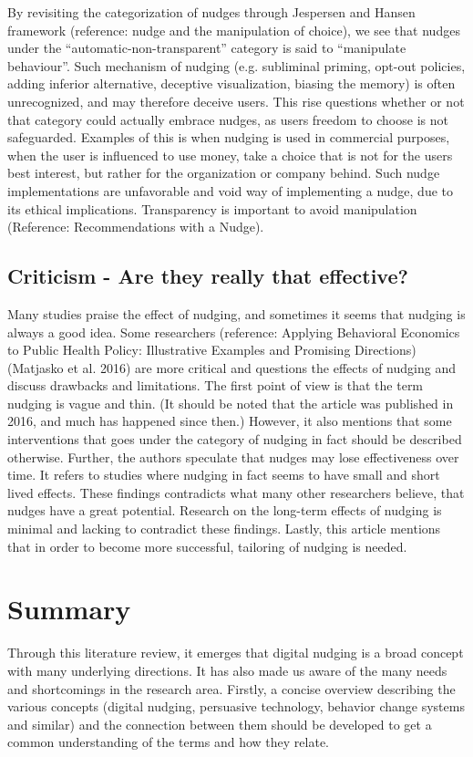 By revisiting the categorization of nudges through Jespersen and Hansen framework (reference: nudge and the manipulation of choice), we see that nudges under the “automatic-non-transparent” category is said to “manipulate behaviour”. Such mechanism of nudging (e.g. subliminal priming, opt-out policies, adding inferior alternative, deceptive visualization, biasing the memory) is often unrecognized, and may therefore deceive users. This rise questions whether or not that category could actually embrace nudges, as users freedom to choose is not safeguarded. Examples of this is when nudging is used in commercial purposes, when the user is influenced to use money, take a choice that is not for the users best interest, but rather for the organization or company behind. Such nudge implementations are unfavorable and void way of implementing a nudge, due to its ethical implications. Transparency is important to avoid manipulation (Reference: Recommendations with a Nudge). 

\subsection{Criticism - Are they really that effective?}
Many studies praise the effect of nudging, and sometimes it seems that nudging is always a good idea. Some researchers (reference: Applying Behavioral Economics to Public Health Policy: Illustrative Examples and Promising Directions) (Matjasko et al. 2016) are more critical and questions the effects of nudging and discuss drawbacks and limitations. The first point of view is that the term nudging is vague and thin. (It should be noted that the article was published in 2016, and much has happened since then.) However, it also mentions that some interventions that goes under the category of nudging in fact should be described otherwise. Further, the authors speculate that nudges may lose effectiveness over time. It refers to studies where nudging in fact seems to have small and short lived effects. These findings contradicts what many other researchers believe, that nudges have a great potential. Research on the long-term effects of nudging is minimal and lacking to contradict these findings. Lastly, this article mentions that in order to become more successful, tailoring of nudging is needed. 

\section{Summary}
Through this literature review, it emerges that digital nudging is a broad concept with many underlying directions. It has also made us aware of the many needs and shortcomings in the research area. Firstly, a concise overview describing the various concepts (digital nudging, persuasive technology, behavior change systems and similar) and the connection between them should be developed to get a common understanding of the terms and how they relate.

